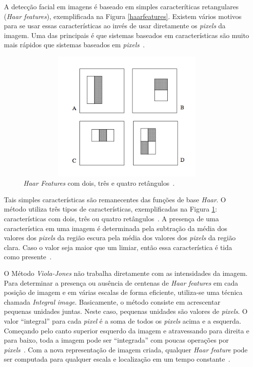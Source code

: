 A detecção facial em imagens é baseado em simples caracteríticas retangulares (\textit{Haar features}), exemplificada na Figura \ref{haarfeatures}. Existem vários motivos para se usar essas características ao invés de usar diretamente os \textit{pixels} da imagem. Uma das principais é que sistemas baseados em características são muito mais rápidos que sistemas baseados em \textit{pixels}~\cite{violajones}. 

\begin{figure}[hbt]
		\begin{center}
			\includegraphics[height=6.5cm,width=12.5cm]{figuras/2.FundamentacaoTeorica/haarfeaturestypes.png}
		\end{center}
		\caption{\textit{Haar Features} com dois, três e quatro retângulos~\cite{violajones}.}
		\label{haarfeaturestypes}
	\end{figure}

Tais simples características são remanecentes das funções de base \textit{Haar}. O método utiliza três tipos de características, exemplificadas na Figura \ref{haarfeaturestypes}: características com dois, três ou quatro retângulos~\cite{violajones}. A presença de uma característica em uma imagem é determinada pela subtração da média dos valores dos \textit{pixels} da região escura pela média dos valores dos \textit{pixels} da região clara. Caso o valor seja maior que um limiar, então essa característica é tida como presente~\cite{servodetection}.

O Método \textit{Viola-Jones} não trabalha diretamente com as intensidades da imagem. Para determinar a presença ou ausência de centenas de \textit{Haar features} em cada posição de imagem e em várias escalas de forma eficiente, utiliza-se uma técnica chamada \textit{Integral image}. Basicamente, o método consiste em acrescentar pequenas unidades juntas. Neste caso, pequenas unidades são valores de \textit{pixels}. O valor ``integral'' para cada \textit{pixel} é a soma de todos os \textit{pixels} acima e a esquerda. Começando pelo canto superior esquerdo da imagem e atravessando para direita e para baixo, toda a imagem pode ser ``integrada'' com poucas operações por \textit{pixels}~\cite{servodetection, violajones}. Com a nova representação de imagem criada, qualquer \textit{Haar feature} pode ser computada para qualquer escala e localização em um tempo constante~\cite{violajones}.

